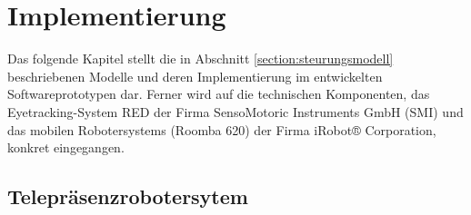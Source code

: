 \chapter{Implementierung}
\label{chapter:implementierung}
Das folgende Kapitel stellt die in Abschnitt \ref{section:steurungsmodell} beschriebenen Modelle und deren Implementierung im entwickelten Softwareprototypen dar. Ferner wird auf die technischen Komponenten, das Eyetracking-System RED der Firma SensoMotoric Instruments GmbH (SMI) und das mobilen Robotersystems (Roomba 620) der Firma iRobot® Corporation, konkret eingegangen.

\section{Telepräsenzrobotersytem}
